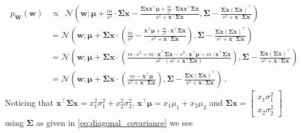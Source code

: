 \documentclass[a4paper]{article}
\newcommand{\Normal}[3]{{\mathcal N} \left({#1};{#2},{#3}\right)}
\newcommand{\bs}[1]{{\boldsymbol{#1}}}
\newcommand{\transpose}[1]{{#1}^\top}
\theoremstyle{definition}
\begin{document}
\begin{align*}
    p_{\bs{W}}(\bs{w}) 
    & \propto \ \ \Normal{\bs{w}}{\bs{\mu} + \frac{m}{s^2} \cdot \bs{\Sigma}\bs{x} - \frac{\bs{\Sigma}\bs{x}\transpose{\bs{x}}\bs{\mu} + \frac{m}{s^2} \cdot \bs{\Sigma}\bs{x}\transpose{\bs{x}}\bs{\Sigma}\bs{x}}{s^2 + \transpose{\bs{x}} \bs{\Sigma} \bs{x}}}{\bs{\Sigma} - \frac{\bs{\Sigma}\bs{x} \transpose{\left( \bs{\Sigma}\bs{x} \right)}}{s^2 + \transpose{\bs{x}} \bs{\Sigma} \bs{x}}} \\
    & = \Normal{\bs{w}}{\bs{\mu} + \bs{\Sigma}\bs{x} \cdot \left( \frac{m}{s^2} - \frac{\transpose{\bs{x}}\bs{\mu} + \frac{m}{s^2} \cdot \transpose{\bs{x}}\bs{\Sigma}\bs{x}}{s^2 + \transpose{\bs{x}} \bs{\Sigma} \bs{x}} \right)}{\bs{\Sigma} - \frac{\bs{\Sigma}\bs{x} \transpose{\left( \bs{\Sigma}\bs{x} \right)}}{s^2 + \transpose{\bs{x}} \bs{\Sigma} \bs{x}}} \\
    & = \Normal{\bs{w}}{\bs{\mu} + \bs{\Sigma}\bs{x} \cdot \left( \frac{m \cdot s^2 + m \cdot \transpose{\bs{x}} \bs{\Sigma} \bs{x} - s^2 \cdot \transpose{\bs{x}}\bs{\mu} - m \cdot \transpose{\bs{x}}\bs{\Sigma}\bs{x}}{s^2 \cdot \left( s^2 + \transpose{\bs{x}} \bs{\Sigma} \bs{x} \right)} \right)}{\bs{\Sigma} - \frac{\bs{\Sigma}\bs{x} \transpose{\left( \bs{\Sigma}\bs{x} \right)}}{s^2 + \transpose{\bs{x}} \bs{\Sigma} \bs{x}}} \\
    & = \Normal{\bs{w}}{\bs{\mu} + \bs{\Sigma}\bs{x} \cdot \left( \frac{m - \transpose{\bs{x}}\bs{\mu}}{s^2 + \transpose{\bs{x}} \bs{\Sigma} \bs{x}} \right)}{\bs{\Sigma} - \frac{\bs{\Sigma}\bs{x} \transpose{\left( \bs{\Sigma}\bs{x} \right)}}{s^2 + \transpose{\bs{x}} \bs{\Sigma} \bs{x}}} \,.
\end{align*}
Noticing that $\transpose{\bs{x}} \bs{\Sigma} \bs{x} = x_1^2 \sigma_1^2 + x_2^2 \sigma_2^2$, $\transpose{\bs{x}}\bs{\mu} = x_1 \mu_1 + x_2 \mu_2$ and $\bs{\Sigma}\bs{x} = \left[ \begin{array}{c} x_1 \sigma_1^2 \\ x_2 \sigma_2^2 \end{array}\right]$ using $\bs{\Sigma}$ as given in \eqref{eq:diagonal_covariance} we see 
\end{document}
